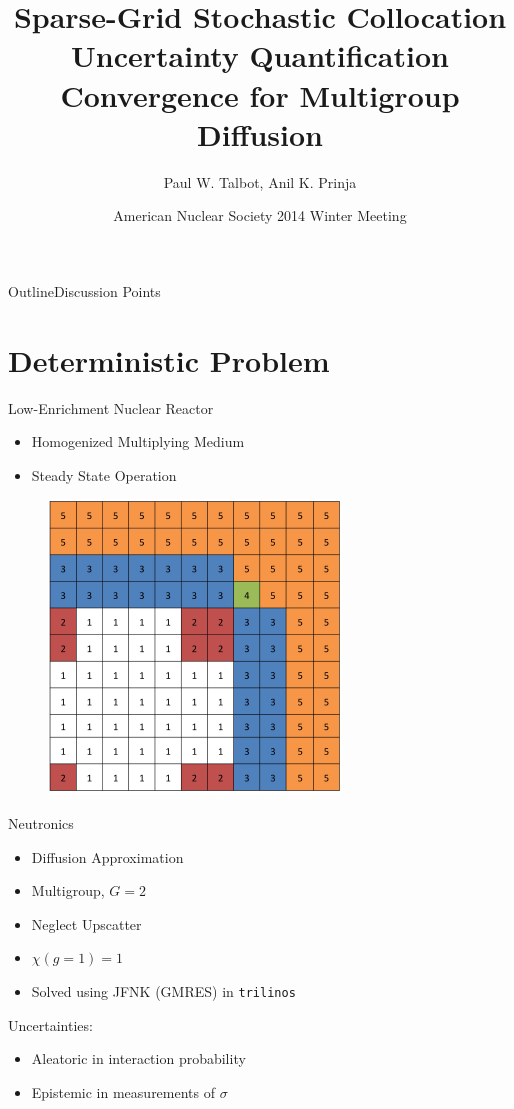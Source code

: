 \documentclass{beamer}
\title[SC UQ for Multigroup Neutron Diffusion] %
{Sparse-Grid Stochastic Collocation Uncertainty Quantification Convergence for Multigroup Diffusion}
\author[Talbot] %
{Paul W. Talbot\inst{1}, Anil K. Prinja\inst{1}}
\institute[University of New Mexico] %
{
  \inst{1}%
  University of New Mexico\\
   \vspace{10pt}
\footnotesize{Supported by Idaho National Laboratory}
}
\date[ANS Winter, 2014] %
{American Nuclear Society 2014 Winter Meeting}
\begin{document}
\begin{frame}
  \titlepage
\end{frame}

\begin{frame}{Outline}{Discussion Points}
  \tableofcontents%
\end{frame}

\section{Deterministic Problem}
\begin{frame}{Low-Enrichment Nuclear Reactor}
\begin{itemize}
\item Homogenized Multiplying Medium
\item Steady State Operation
\end{itemize}
\begin{figure}
  \includegraphics[width=0.5\linewidth]{../graphics/core}
\end{figure}
\end{frame}

\begin{frame}{Neutronics}
\begin{itemize}\vspace{-20pt}
\item Diffusion Approximation
\item Multigroup, $G=2$
\item Neglect Upscatter
\item $\chi(g=1)=1$
\item Solved using JFNK (GMRES) in \texttt{trilinos}
\end{itemize}\vspace{10pt}
Uncertainties:
\begin{itemize}
\item Aleatoric in interaction probability
\item Epistemic in measurements of $\sigma$
\end{itemize}
\end{frame}
\end{document}
